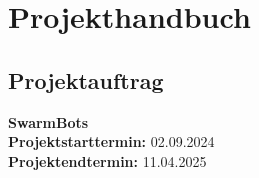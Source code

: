 





\chapter{Projekthandbuch}
\label{sec:projekthandbuch}

\section{Projektauftrag}

\textbf{SwarmBots} \\
\textbf{Projektstarttermin:} 02.09.2024 \\
\textbf{Projektendtermin:} 11.04.2025 \\

